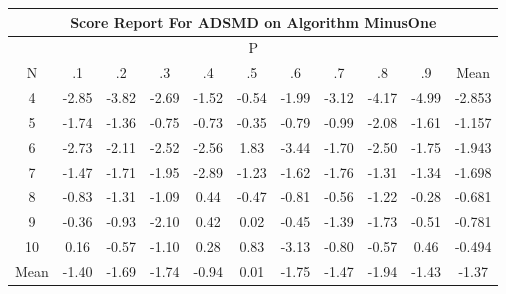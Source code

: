 \documentclass[11pt,a4paper]{report}
\begin{document}
\begin{longtable}{ | c || c | c | c | c | c | c | c | c | c || c |}
\hline
\multicolumn{11}{|c|}{ Score Report For ADSMD on Algorithm MinusOne} \\
\hline
\multicolumn{11}{|c|}{ P } \\
\hline
N & .1 & .2 & .3 & .4 & .5 & .6 & .7 & .8 & .9 & Mean\\
 \hline
 \hline
 \endhead
  4 &  \cellcolor[HTML]{FFB7B7} -2.85 &  \cellcolor[HTML]{FF9F9F} -3.82 &  \cellcolor[HTML]{FFBFBF} -2.69 &  \cellcolor[HTML]{FFD7D7} -1.52 &  \cellcolor[HTML]{FFEFEF} -0.54 &  \cellcolor[HTML]{FFCFCF} -1.99 &  \cellcolor[HTML]{FFAFAF} -3.12 &  \cellcolor[HTML]{FF9797} -4.17 &  \cellcolor[HTML]{FF8080} -4.99 & -2.853 \\
  5 &  \cellcolor[HTML]{FFD7D7} -1.74 &  \cellcolor[HTML]{FFDFDF} -1.36 &  \cellcolor[HTML]{FFEFEF} -0.75 &  \cellcolor[HTML]{FFEFEF} -0.73 &  \cellcolor[HTML]{FFF7F7} -0.35 &  \cellcolor[HTML]{FFEFEF} -0.79 &  \cellcolor[HTML]{FFE7E7} -0.99 &  \cellcolor[HTML]{FFC7C7} -2.08 &  \cellcolor[HTML]{FFD7D7} -1.61 & -1.157 \\
  6 &  \cellcolor[HTML]{FFB7B7} -2.73 &  \cellcolor[HTML]{FFC7C7} -2.11 &  \cellcolor[HTML]{FFBFBF} -2.52 &  \cellcolor[HTML]{FFBFBF} -2.56 &  \cellcolor[HTML]{CFCFFF} 1.83 &  \cellcolor[HTML]{FFA7A7} -3.44 &  \cellcolor[HTML]{FFD7D7} -1.70 &  \cellcolor[HTML]{FFBFBF} -2.50 &  \cellcolor[HTML]{FFCFCF} -1.75 & -1.943 \\
  7 &  \cellcolor[HTML]{FFD7D7} -1.47 &  \cellcolor[HTML]{FFD7D7} -1.71 &  \cellcolor[HTML]{FFCFCF} -1.95 &  \cellcolor[HTML]{FFB7B7} -2.89 &  \cellcolor[HTML]{FFDFDF} -1.23 &  \cellcolor[HTML]{FFD7D7} -1.62 &  \cellcolor[HTML]{FFCFCF} -1.76 &  \cellcolor[HTML]{FFDFDF} -1.31 &  \cellcolor[HTML]{FFDFDF} -1.34 & -1.698 \\
  8 &  \cellcolor[HTML]{FFE7E7} -0.83 &  \cellcolor[HTML]{FFDFDF} -1.31 &  \cellcolor[HTML]{FFE7E7} -1.09 &  \cellcolor[HTML]{F7F7FF} 0.44 &  \cellcolor[HTML]{FFF7F7} -0.47 &  \cellcolor[HTML]{FFE7E7} -0.81 &  \cellcolor[HTML]{FFEFEF} -0.56 &  \cellcolor[HTML]{FFDFDF} -1.22 &  \cellcolor[HTML]{FFF7F7} -0.28 & -0.681 \\
  9 &  \cellcolor[HTML]{FFF7F7} -0.36 &  \cellcolor[HTML]{FFE7E7} -0.93 &  \cellcolor[HTML]{FFC7C7} -2.10 &  \cellcolor[HTML]{F7F7FF} 0.42 &  \cellcolor[HTML]{FFFFFF} 0.02 &  \cellcolor[HTML]{FFF7F7} -0.45 &  \cellcolor[HTML]{FFDFDF} -1.39 &  \cellcolor[HTML]{FFD7D7} -1.73 &  \cellcolor[HTML]{FFEFEF} -0.51 & -0.781 \\
  10 &  \cellcolor[HTML]{FFFFFF} 0.16 &  \cellcolor[HTML]{FFEFEF} -0.57 &  \cellcolor[HTML]{FFE7E7} -1.10 &  \cellcolor[HTML]{F7F7FF} 0.28 &  \cellcolor[HTML]{E7E7FF} 0.83 &  \cellcolor[HTML]{FFAFAF} -3.13 &  \cellcolor[HTML]{FFE7E7} -0.80 &  \cellcolor[HTML]{FFEFEF} -0.57 &  \cellcolor[HTML]{F7F7FF} 0.46 & -0.494 \\
 \hline
 \hline
Mean &  \cellcolor[HTML]{FFDFDF} -1.40 &  \cellcolor[HTML]{FFD7D7} -1.69 &  \cellcolor[HTML]{FFD7D7} -1.74 &  \cellcolor[HTML]{FFE7E7} -0.94 &  \cellcolor[HTML]{FFFFFF} 0.01 &  \cellcolor[HTML]{FFCFCF} -1.75 &  \cellcolor[HTML]{FFD7D7} -1.47 &  \cellcolor[HTML]{FFCFCF} -1.94 &  \cellcolor[HTML]{FFD7D7} -1.43 &  \cellcolor[HTML]{FFDFDF} -1.37
\end{longtable}
\end{document}

